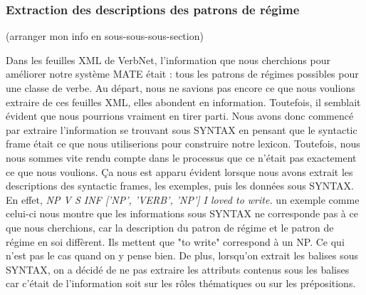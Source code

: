 \documentclass[12pt,maitrise,frenchb,natbib,twoside,initial]{dms}
\numberwithin{equation}{section}
\numberwithin{table}{chapter}
\numberwithin{figure}{chapter}
\begin{document}
\subsubsection{Extraction des descriptions des  patrons de régime}

(arranger mon info en sous-sous-sous-section)

Dans les feuilles XML de VerbNet, l'information que nous cherchions pour améliorer notre système MATE était : tous les patrons de régimes possibles pour une classe de verbe. Au départ, nous ne savions pas encore ce que nous voulions extraire de ces feuilles XML, elles abondent en information. Toutefois, il semblait évident que nous pourrions vraiment en tirer parti. Nous avons donc commencé par extraire l'information se trouvant sous SYNTAX en pensant que le syntactic frame était ce que nous utiliserions pour construire notre lexicon. Toutefois, nous nous sommes vite rendu compte dans le processus que ce n'était pas exactement ce que  nous voulions. Ça nous est apparu évident lorsque nous avons extrait les descriptions des syntactic frames, les exemples, puis les données sous SYNTAX. En effet, \emph{ NP V S INF ['NP', 'VERB', 'NP'] I loved to write.} un exemple comme celui-ci nous montre que les informations sous SYNTAX ne corresponde pas à ce que nous cherchions, car la description du patron de régime et le patron de régime en soi diffèrent. Ils mettent que "to write" correspond à un NP. Ce qui n'est pas le cas quand on y pense bien. De plus, lorsqu'on extrait les balises sous SYNTAX, on a décidé de ne pas extraire les attributs contenus sous les balises car c'était de l'information soit sur les rôles thématiques ou sur les prépositions. 
\\[12pt]
\end{document}

